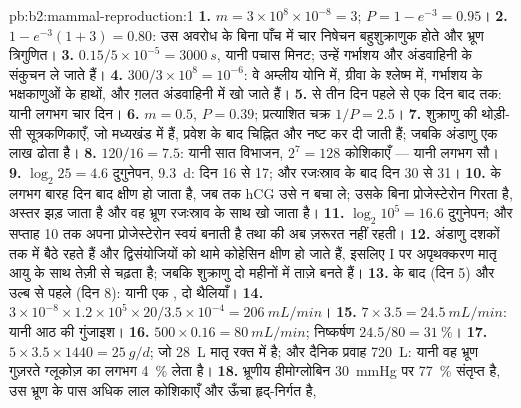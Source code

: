 \begin{solution}{pb:b2:mammal-reproduction:1}
\textbf{1.} $m = 3\times 10^{8}\times 10^{-8} = 3$; $P = 1 - e^{-3} =
0.95$।
\textbf{2.} $1 - e^{-3}(1 + 3) = 0.80$: उस अवरोध के बिना पाँच में चार
निषेचन बहुशुक्राणुक होते और भ्रूण त्रिगुणित।
\textbf{3.} $0.15/5\times 10^{-5} = \qty{3000}{s}$, यानी पचास मिनट;
उन्हें गर्भाशय और अंडवाहिनी के संकुचन ले जाते हैं।
\textbf{4.} $300/3\times 10^{8} = 10^{-6}$: वे अम्लीय योनि में, ग्रीवा
के श्लेष्म में, गर्भाशय के भक्षकाणुओं के हाथों, और ग़लत अंडवाहिनी में
खो जाते हैं।
\textbf{5.}  से तीन दिन पहले से एक दिन बाद तक: यानी लगभग
चार दिन।
\textbf{6.} $m = 0.5$, $P = 0.39$; प्रत्याशित चक्र $1/P = 2.5$।
\textbf{7.} शुक्राणु की थोड़ी-सी सूत्रकणिकाएँ, जो मध्यखंड में हैं,
प्रवेश के बाद चिह्नित और नष्ट कर दी जाती हैं; जबकि अंडाणु एक लाख ढोता है।
\textbf{8.} $120/16 = 7.5$: यानी सात विभाजन, $2^{7} = 128$ कोशिकाएँ ---
यानी लगभग सौ।
\textbf{9.} $\log_2 25 = 4.6$ दुगुनेपन, \qty{9.3}{d}: दिन 16 से 17;
और रजःस्राव के बाद दिन 30 से 31।
\textbf{10.}   के लगभग बारह दिन बाद
क्षीण हो जाता है, जब तक hCG उसे न बचा ले; उसके बिना प्रोजेस्टेरोन गिरता
है, अस्तर झड़ जाता है और वह भ्रूण रजःस्राव के साथ खो जाता है।
\textbf{11.} $\log_2 10^{5} = 16.6$ दुगुनेपन; और सप्ताह 10 तक
 अपना प्रोजेस्टेरोन स्वयं बनाती है तथा  की अब
ज़रूरत नहीं रहती।
\textbf{12.} अंडाणु दशकों तक  में बैठे रहते हैं और
द्विसंयोजियों को थामे कोहेसिन क्षीण हो जाते हैं, इसलिए  I
पर अपृथक्करण मातृ आयु के साथ तेज़ी से चढ़ता है; जबकि शुक्राणु दो महीनों
में ताज़े बनते हैं।
\textbf{13.}  के बाद (दिन 5) और उल्ब से पहले (दिन
8): यानी एक , दो थैलियाँ।
\textbf{14.} $3\times 10^{-8}\times 1.2\times 10^{5}\times 20/3.5\times
10^{-4} = \qty{206}{mL/min}$।
\textbf{15.} $7\times 3.5 = \qty{24.5}{mL/min}$: यानी आठ की गुंजाइश।
\textbf{16.} $500\times 0.16 = \qty{80}{mL/min}$; निष्कर्षण
$24.5/80 = \qty{31}{\%}$।
\textbf{17.} $5\times 3.5\times 1440 = \qty{25}{g/d}$; जो \qty{28}{L}
मातृ रक्त में है; और दैनिक प्रवाह \qty{720}{L}: यानी वह भ्रूण गुज़रते
ग्लूकोज़ का लगभग \qty{4}{\%} लेता है।
\textbf{18.} भ्रूणीय हीमोग्लोबिन \qty{30}{mmHg} पर \qty{77}{\%}
संतृप्त है, उस भ्रूण के पास अधिक लाल कोशिकाएँ और ऊँचा हृद्-निर्गत है,

\end{solution}
